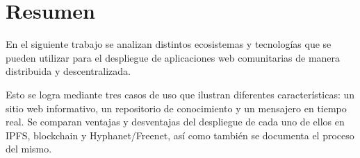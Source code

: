 \section{Resumen}

En el siguiente trabajo se analizan distintos ecosistemas y tecnologías que se pueden utilizar para el despliegue de aplicaciones web comunitarias de manera distribuida y descentralizada.

Esto se logra mediante tres casos de uso que ilustran diferentes características: un sitio web informativo, un repositorio de conocimiento y un mensajero en tiempo real. Se comparan ventajas y desventajas del despliegue de cada uno de ellos en IPFS, blockchain y Hyphanet/Freenet, así como también se documenta el proceso del mismo.